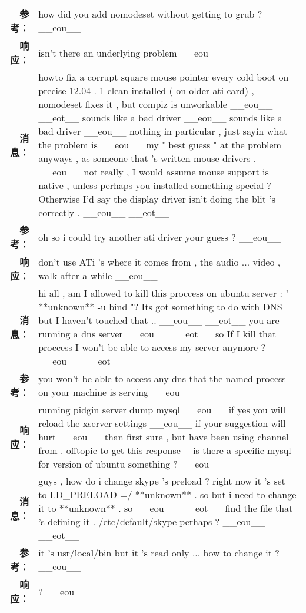\begin{tabularx}{\textwidth}{@{}rX@{}}
\textbf{参考：}&how did you add nomodeset without getting to grub ? \_\_eou\_\_\\%
\textbf{响应：}&isn't there an underlying problem \_\_eou\_\_\\%
\midrule%
\textbf{消息：}&howto fix a corrupt square mouse pointer every cold boot on precise 12.04 . 1 clean installed ( on older ati card) , nomodeset fixes it , but compiz is unworkable \_\_eou\_\_ \_\_eot\_\_ sounds like a bad driver \_\_eou\_\_ sounds like a bad driver \_\_eou\_\_ nothing in particular , just sayin what the problem is \_\_eou\_\_ my " best guess " at the problem anyways , as someone that 's written mouse drivers . \_\_eou\_\_ not really , I would assume mouse support is native , unless perhaps you installed something special ? Otherwise I'd say the display driver isn't doing the blit 's correctly . \_\_eou\_\_ \_\_eot\_\_\\%
\textbf{参考：}&oh so i could try another ati driver your guess ? \_\_eou\_\_\\%
\textbf{响应：}&don't use ATi 's where it comes from , the audio ... video , walk after a while \_\_eou\_\_\\%
\midrule%
\textbf{消息：}&hi all , am I allowed to kill this proccess on ubuntu server : " **unknown** {-}u bind "? Its got something to do with DNS but I haven't touched that .. \_\_eou\_\_ \_\_eot\_\_ you are running a dns server \_\_eou\_\_ \_\_eot\_\_ so If I kill that proccess I won't be able to access my server anymore ? \_\_eou\_\_ \_\_eot\_\_\\%
\textbf{参考：}&you won't be able to access any dns that the named process on your machine is serving \_\_eou\_\_\\%
\textbf{响应：}&running pidgin server dump mysql \_\_eou\_\_ if yes you will reload the xserver settings \_\_eou\_\_ if your suggestion will hurt \_\_eou\_\_ than first sure , but have been using channel from . offtopic to get this response {-}{-} is there a specific mysql for version of ubuntu something ? \_\_eou\_\_\\%
\midrule%
\textbf{消息：}&guys , how do i change skype 's preload ? right now it 's set to LD\_PRELOAD =/ **unknown** . so but i need to change it to **unknown** . so \_\_eou\_\_ \_\_eot\_\_ find the file that 's defining it . /etc/default/skype perhaps ? \_\_eou\_\_ \_\_eot\_\_\\%
\textbf{参考：}&it 's usr/local/bin but it 's read only ... how to change it ? \_\_eou\_\_\\%
\textbf{响应：}&? \_\_eou\_\_\\%

\end{tabularx}
